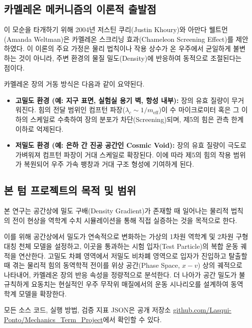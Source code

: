 \documentclass[11pt, a4paper]{article}
\begin{document}
\subsection{카멜레온 메커니즘의 이론적 출발점}
이 모순을 타개하기 위해 2004년 저스틴 쿠리(Justin Khoury)와 아만다 웰트먼(Amanda Weltman)은 카멜레온 스크리닝 효과(Chameleon Screening Effect)를 제안하였다\cite{Khoury2004prl, Khoury2004prd}. 이 이론의 주요 가정은 물리 법칙이나 작용 상수가 온 우주에서 균일하게 불변하는 것이 아니라, 주변 환경의 물질 밀도(Density)에 반응하여 동적으로 조절된다는 점이다.

카멜레온 장의 거동 방식은 다음과 같이 요약된다.
\begin{itemize}
    \item \textbf{고밀도 환경 (예: 지구 표면, 실험실 용기 벽, 항성 내부):} 장의 유효 질량이 무거워진다. 힘의 전달 범위인 컴프턴 파장($\lambda_c \sim 1/m_{\text{eff}}$)이 수 마이크로미터 혹은 그 이하의 스케일로 수축하여 장의 분포가 차단(Screening)되며, 제5의 힘은 관측 한계 이하로 억제된다.
    \item \textbf{저밀도 환경 (예: 은하 간 진공 공간인 Cosmic Void):} 장의 유효 질량이 극도로 가벼워져 컴프턴 파장이 거대 스케일로 확장된다. 이에 따라 제5의 힘의 작용 범위가 복원되어 우주 가속 팽창과 거대 구조 형성에 기여하게 된다.
\end{itemize}

\subsection{본 텀 프로젝트의 목적 및 범위}
본 연구는 공간상에 밀도 구배(Density Gradient)가 존재할 때 일어나는 물리적 법칙의 전이 현상을 역학계 수치 시뮬레이션을 통해 직접 실증하는 것을 목적으로 한다.

이를 위해 공간상에서 밀도가 연속적으로 변화하는 가상의 1차원 역학계 및 2차원 구형 대칭 천체 모델을 설정하고, 이곳을 통과하는 시험 입자(Test Particle)의 복합 운동 궤적을 연산한다. 고밀도 차폐 영역에서 저밀도 비차폐 영역으로 입자가 진입하고 탈출할 때 겪는 물리적 힘의 동역학적 전이를 위상 공간(Phase Space, $x-v$) 상의 궤적으로 나타내어, 카멜레온 장의 반응 속성을 정량적으로 분석한다. 더 나아가 공간 밀도가 불규칙하게 요동치는 현실적인 우주 무작위 매질에서의 운동 시나리오를 설계하여 동역학계 모델을 확장한다.

모든 소스 코드, 실행 방법, 검증 지표 JSON은 공개 저장소
\href{https://github.com/Lasqui-Ponto/Mechanics_Term_Project}{github.com/Lasqui-Ponto/Mechanics\_Term\_Project}에서 확인할 수 있다.

\end{document}
